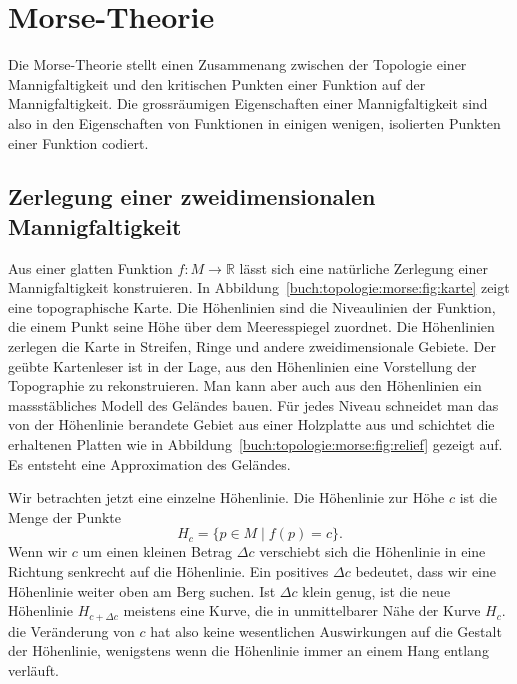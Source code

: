 %
%
\section{Morse-Theorie
\label{buch:topologie:section:morse}}
Die Morse-Theorie stellt einen Zusammenang zwischen der Topologie einer 
Mannigfaltigkeit und den kritischen Punkten einer Funktion auf der
Mannigfaltigkeit.
Die grossräumigen Eigenschaften einer Mannigfaltigkeit sind also
in den Eigenschaften von Funktionen in einigen wenigen, isolierten
Punkten einer Funktion codiert.

%
%
\subsection{Zerlegung einer zweidimensionalen Mannigfaltigkeit}
%
%
Aus einer glatten Funktion $f\colon M\to\mathbb{R}$ lässt
sich eine natürliche Zerlegung einer Mannigfaltigkeit konstruieren.
In Abbildung~\ref{buch:topologie:morse:fig:karte} zeigt eine 
topographische Karte.
Die Höhenlinien sind die Niveaulinien der Funktion, die einem
Punkt seine Höhe über dem Meeresspiegel zuordnet.
Die Höhenlinien zerlegen die Karte in Streifen, Ringe und andere
zweidimensionale Gebiete.
Der geübte Kartenleser ist in der Lage, aus den Höhenlinien eine
Vorstellung der Topographie zu rekonstruieren.
Man kann aber auch aus den Höhenlinien ein massstäbliches Modell
des Geländes bauen.
Für jedes Niveau schneidet man das von der Höhenlinie berandete Gebiet
aus einer Holzplatte aus und schichtet die erhaltenen Platten
wie in Abbildung~\ref{buch:topologie:morse:fig:relief} gezeigt
auf.
Es entsteht eine Approximation des Geländes.

Wir betrachten jetzt eine einzelne Höhenlinie.
Die Höhenlinie zur Höhe $c$ ist die Menge der Punkte
\[
H_c
=
\{ p\in M\mid f(p) = c \}.
\]
Wenn wir $c$ um einen kleinen Betrag $\Delta c$ verschiebt sich
die Höhenlinie in eine Richtung senkrecht auf die Höhenlinie.
Ein positives $\Delta c$ bedeutet, dass wir eine Höhenlinie weiter
oben am Berg suchen.
Ist $\Delta c$ klein genug, ist die neue Höhenlinie $H_{c+\Delta c}$
meistens eine Kurve, die in unmittelbarer Nähe der Kurve $H_c$.
die Veränderung von $c$ hat also keine wesentlichen Auswirkungen
auf die Gestalt der Höhenlinie, wenigstens wenn die Höhenlinie
immer an einem Hang entlang verläuft.


